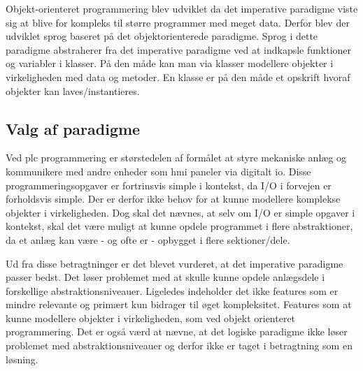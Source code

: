 Objekt-orienteret programmering blev udviklet da det imperative paradigme viste sig at blive for kompleks til større programmer med meget data. Derfor blev der udviklet sprog baseret på det objektorienterede paradigme. Sprog i dette paradigme abstraherer fra det imperative paradigme ved at indkapsle funktioner og variabler i klasser. På den måde kan man via klasser modellere objekter i virkeligheden med data og metoder. En klasse er på den måde et opskrift hvoraf objekter kan laves/instantieres.

\subsection{Valg af paradigme}\label{ssec:paradigmevalg}
Ved \gls{plc} programmering er størstedelen af formålet at styre mekaniske anlæg og kommunikere med andre enheder som \gls{hmi} paneler via digitalt \gls{io}. Disse programmeringsopgaver er fortrinsvis simple i kontekst, da I/O i forvejen er forholdsvis simple. Der er derfor ikke behov for at kunne modellere komplekse objekter i virkeligheden. Dog skal det nævnes, at selv om I/O er simple opgaver i kontekst, skal det være muligt at kunne opdele programmet i flere abstraktioner, da et anlæg kan være - og ofte er - opbygget i flere sektioner/dele.

Ud fra disse betragtninger er det blevet vurderet, at det imperative paradigme passer bedst. Det løser problemet med at skulle kunne opdele anlægsdele i forskellige abstraktionsniveauer. Ligeledes indeholder det ikke features som er mindre relevante og primært kun bidrager til øget kompleksitet. Features som at kunne modellere objekter i virkeligheden, som ved objekt orienteret programmering. Det er også værd at nævne, at det logiske paradigme ikke løser problemet med abstraktionsniveauer og derfor ikke er taget i betragtning som en løsning.


